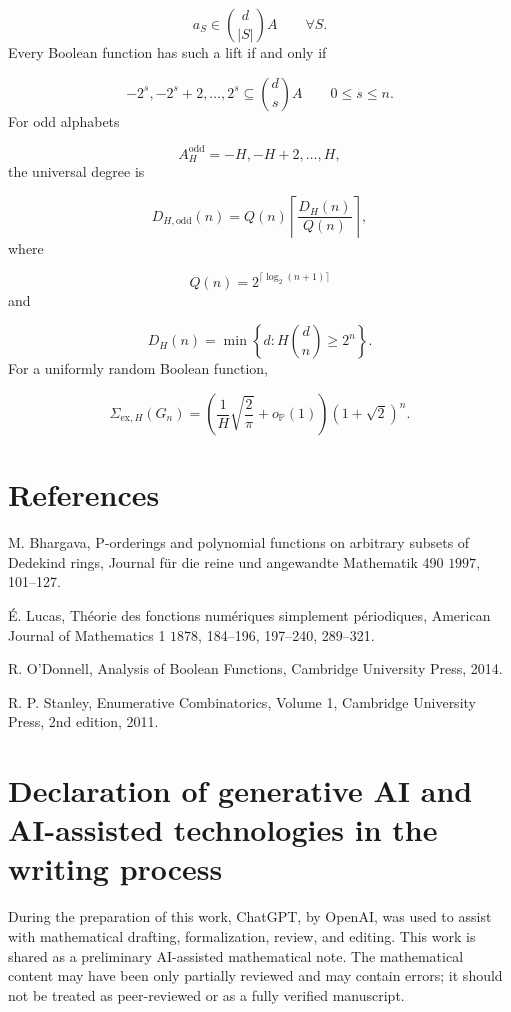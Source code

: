 \documentclass[11pt]{article}
\theoremstyle{definition}
\begin{document}
\[
a_S\in \binom d{|S|}A
\qquad
\forall S.
\]
Every Boolean function has such a lift if and only if

\[
{-2^s,-2^s+2,\dots,2^s}
\subseteq
\binom ds A
\qquad
0\le s\le n.
\]
For odd alphabets

\[
A_H^{\mathrm{odd}}={-H,-H+2,\dots,H},
\]
the universal degree is

\[
D_{H,\mathrm{odd}}(n)
=
Q(n)
\left\lceil
\frac{D_H(n)}{Q(n)}
\right\rceil,
\]
where

\[
Q(n)=2^{\lceil\log_2(n+1)\rceil}
\]
and

\[
D_H(n)=
\min\left\{
d:H\binom dn\ge2^n
\right\}.
\]
For a uniformly random Boolean function,

\[
\Sigma_{\mathrm{ex},H}(G_n)
=
\left(
\frac1H\sqrt{\frac2\pi}
+
o_{\mathbb{P}}(1)
\right)
(1+\sqrt2)^n.
\]
\section*{References}
M. Bhargava, P-orderings and polynomial functions on arbitrary subsets of Dedekind rings, Journal für die reine und angewandte Mathematik 490 $1997$, 101--127.

É. Lucas, Théorie des fonctions numériques simplement périodiques, American Journal of Mathematics 1 $1878$, 184--196, 197--240, 289--321.

R. O'Donnell, Analysis of Boolean Functions, Cambridge University Press, 2014.

R. P. Stanley, Enumerative Combinatorics, Volume 1, Cambridge University Press, 2nd edition, 2011.


\section*{Declaration of generative AI and AI-assisted technologies in the writing process}
During the preparation of this work, ChatGPT, by OpenAI, was used to assist with mathematical drafting, formalization, review, and editing. This work is shared as a preliminary AI-assisted mathematical note. The mathematical content may have been only partially reviewed and may contain errors; it should not be treated as peer-reviewed or as a fully verified manuscript.
\end{document}
